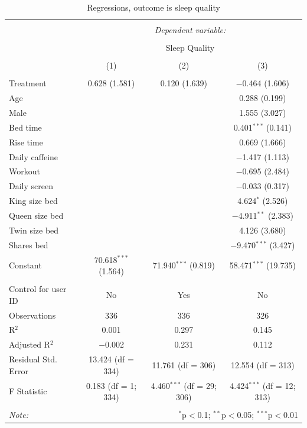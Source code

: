 \documentclass[12pt,]{article}
\begin{document}
\begin{table}[!htbp] \centering 
  \caption{\label{tab:quality_regressions} Regressions, outcome is sleep quality} 
  \label{} 
\begin{tabular}{@{\extracolsep{5pt}}lccc} 
\\[-1.8ex]\hline 
\hline \\[-1.8ex] 
 & \multicolumn{3}{c}{\textit{Dependent variable:}} \\ 
\cline{2-4} 
\\[-1.8ex] & \multicolumn{3}{c}{Sleep Quality} \\ 
\\[-1.8ex] & (1) & (2) & (3)\\ 
\hline \\[-1.8ex] 
 Treatment & 0.628 (1.581) & 0.120 (1.639) & $-$0.464 (1.606) \\ 
  Age &  &  & 0.288 (0.199) \\ 
  Male &  &  & 1.555 (3.027) \\ 
  Bed time &  &  & 0.401$^{***}$ (0.141) \\ 
  Rise time &  &  & 0.669 (1.666) \\ 
  Daily caffeine &  &  & $-$1.417 (1.113) \\ 
  Workout &  &  & $-$0.695 (2.484) \\ 
  Daily screen &  &  & $-$0.033 (0.317) \\ 
  King size bed &  &  & 4.624$^{*}$ (2.526) \\ 
  Queen size bed &  &  & $-$4.911$^{**}$ (2.383) \\ 
  Twin size bed &  &  & 4.126 (3.680) \\ 
  Shares bed &  &  & $-$9.470$^{***}$ (3.427) \\ 
  Constant & 70.618$^{***}$ (1.564) & 71.940$^{***}$ (0.819) & 58.471$^{***}$ (19.735) \\ 
 \hline \\[-1.8ex] 
Control for user ID & No & Yes & No \\ 
Observations & 336 & 336 & 326 \\ 
R$^{2}$ & 0.001 & 0.297 & 0.145 \\ 
Adjusted R$^{2}$ & $-$0.002 & 0.231 & 0.112 \\ 
Residual Std. Error & 13.424 (df = 334) & 11.761 (df = 306) & 12.554 (df = 313) \\ 
F Statistic & 0.183 (df = 1; 334) & 4.460$^{***}$ (df = 29; 306) & 4.424$^{***}$ (df = 12; 313) \\ 
\hline 
\hline \\[-1.8ex] 
\textit{Note:}  & \multicolumn{3}{r}{$^{*}$p$<$0.1; $^{**}$p$<$0.05; $^{***}$p$<$0.01} \\ 
\end{tabular} 
\end{table}
\end{document}
